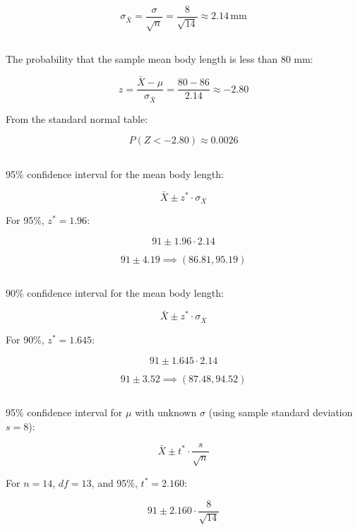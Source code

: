 \documentclass{homework}
\begin{document}
\[
\sigma_{\bar{X}} = \frac{\sigma}{\sqrt{n}} = \frac{8}{\sqrt{14}} \approx 2.14 \, \text{mm}
\]

\subsection{}

The probability that the sample mean body length is less than 80 mm:

\[
z = \frac{\bar{X} - \mu}{\sigma_{\bar{X}}} = \frac{80 - 86}{2.14} \approx -2.80
\]

From the standard normal table:

\[
P(Z < -2.80) \approx 0.0026
\]

\subsection{}

95\% confidence interval for the mean body length:

\[
\bar{X} \pm z^* \cdot \sigma_{\bar{X}}
\]

For 95\%, \( z^* = 1.96 \):

\[
91 \pm 1.96 \cdot 2.14
\]

\[
91 \pm 4.19 \implies (86.81, 95.19)
\]

\subsection{}

90\% confidence interval for the mean body length:

\[
\bar{X} \pm z^* \cdot \sigma_{\bar{X}}
\]

For 90\%, \( z^* = 1.645 \):

\[
91 \pm 1.645 \cdot 2.14
\]

\[
91 \pm 3.52 \implies (87.48, 94.52)
\]

\subsection{}

95\% confidence interval for \( \mu \) with unknown \( \sigma \) (using sample standard deviation \( s = 8 \)):

\[
\bar{X} \pm t^* \cdot \frac{s}{\sqrt{n}}
\]

For \( n = 14 \), \( df = 13 \), and 95\%, \( t^* = 2.160 \):

\[
91 \pm 2.160 \cdot \frac{8}{\sqrt{14}}
\]
\end{document}
